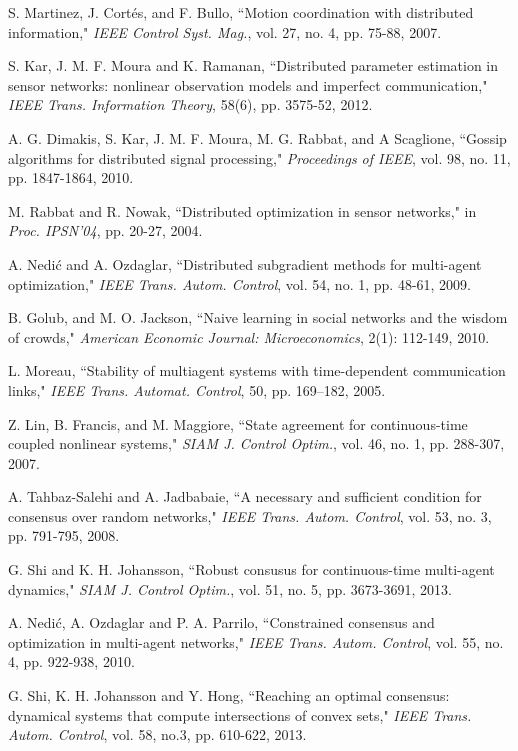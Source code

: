 \documentclass[a4paper, 11pt]{article}
\begin{document}
\begin{thebibliography}{99}
 S. Martinez, J. Cort\'{e}s, and F. Bullo, ``Motion coordination with distributed
information," {\em IEEE Control Syst. Mag.}, vol. 27, no. 4, pp.
75-88, 2007.

 S. Kar, J. M. F. Moura and K. Ramanan, ``Distributed parameter estimation in sensor networks:
nonlinear observation models and imperfect communication,"  {\em IEEE Trans.
Information Theory}, 58(6), pp. 3575-52, 2012.

 A. G. Dimakis,  S. Kar,
J. M. F. Moura,  M. G. Rabbat,  and
A Scaglione,  ``Gossip algorithms for
distributed signal processing,"  {\em Proceedings of IEEE}, vol. 98, no. 11, pp. 1847-1864, 2010.

 M. Rabbat and R. Nowak, ``Distributed optimization in sensor networks,"
in {\em Proc. IPSN’04},  pp. 20-27, 2004.

 A. Nedi\'{c} and A. Ozdaglar, ``Distributed subgradient methods for multi-agent optimization,"
{\em IEEE Trans. Autom. Control}, vol. 54, no. 1, pp. 48-61, 2009.

B. Golub,  and M. O. Jackson,  ``Naive learning in social networks
and the wisdom of crowds,"  {\em American Economic Journal: Microeconomics}, 2(1): 112-149, 2010.

 L. Moreau, ``Stability of multiagent systems with time-dependent communication links," {\em IEEE Trans. Automat. Control}, 50, pp. 169–182, 2005.

 Z. Lin, B. Francis, and M. Maggiore,
``State agreement for continuous-time coupled nonlinear systems," {\em SIAM J. Control Optim.}, vol. 46, no. 1, pp. 288-307, 2007.

 A. Tahbaz-Salehi and A. Jadbabaie, ``A necessary and sufficient condition
for consensus over random networks," {\em IEEE Trans. Autom. Control},
vol. 53, no. 3, pp. 791-795, 2008.

     G. Shi and K. H. Johansson, ``Robust consusus for continuous-time multi-agent dynamics," {\em SIAM J. Control Optim.}, vol. 51, no. 5, pp. 3673-3691, 2013.

 A. Nedi\'{c}, A. Ozdaglar and P. A. Parrilo, ``Constrained consensus and optimization in multi-agent networks," {\em IEEE Trans. Autom. Control}, vol. 55, no. 4, pp. 922-938, 2010.

 G. Shi, K. H. Johansson and Y. Hong,
``Reaching an optimal consensus: dynamical systems that compute intersections of convex sets," {\em IEEE Trans.
Autom. Control},  vol. 58, no.3, pp. 610-622,  2013.


\end{thebibliography}
\end{document}
